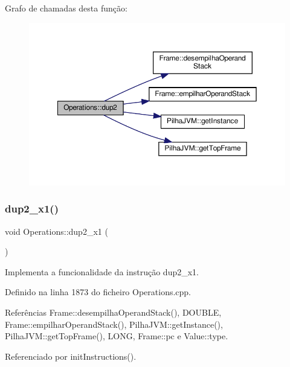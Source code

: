 Grafo de chamadas desta função\+:\nopagebreak
\begin{figure}[H]
\begin{center}
\leavevmode
\includegraphics[width=350pt]{classOperations_a7cb6985281b1ab32e905e4726ef2c964_cgraph}
\end{center}
\end{figure}
\mbox{\label{classOperations_a57b0cf4d7a133bf35b39fcf8d6e15511}} 
\subsubsection{\texorpdfstring{dup2\+\_\+x1()}{dup2\_x1()}}
{\footnotesize\ttfamily void Operations\+::dup2\+\_\+x1 (\begin{DoxyParamCaption}{ }\end{DoxyParamCaption})\hspace{0.3cm}{\ttfamily [private]}}



Implementa a funcionalidade da instrução dup2\+\_\+x1. 



Definido na linha 1873 do ficheiro Operations.\+cpp.



Referências Frame\+::desempilha\+Operand\+Stack(), D\+O\+U\+B\+LE, Frame\+::empilhar\+Operand\+Stack(), Pilha\+J\+V\+M\+::get\+Instance(), Pilha\+J\+V\+M\+::get\+Top\+Frame(), L\+O\+NG, Frame\+::pc e Value\+::type.



Referenciado por init\+Instructions().

